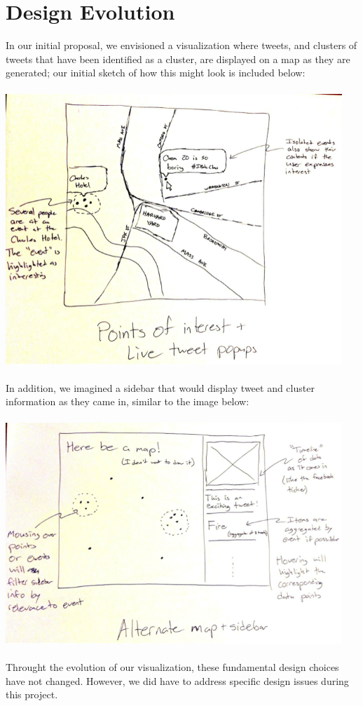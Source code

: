 \documentclass[pdftex,12pt,a4paper]{article}
\begin{document}
\section{Design Evolution}
In our initial proposal, we envisioned a visualization where tweets, and clusters of tweets that have been identified as a cluster, are displayed on a map as they are generated; our initial sketch of how this might look is included below: \\ \\
\includegraphics[width=5in]{proposal1.png} \\ \\
In addition, we imagined a sidebar that would display tweet and cluster information as they came in, similar to the image below: \\ \\
\includegraphics[width=5in]{proposal2.png} \\ \\
Throught the evolution of our visualization, these fundamental design choices have not changed. However, we did have to address specific design issues during this project.
\end{document}
